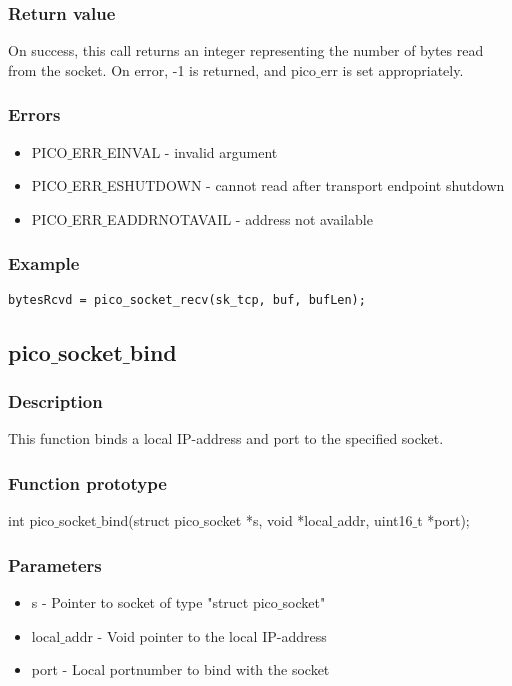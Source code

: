 \subsubsection*{Return value}
On success, this call returns an integer representing the number of bytes read
from the socket. On error, -1 is returned, and pico$\_$err is set appropriately.

\subsubsection*{Errors}
\begin{itemize}
\item PICO$\_$ERR$\_$EINVAL - invalid argument
\item PICO$\_$ERR$\_$ESHUTDOWN - cannot read after transport endpoint shutdown
\item PICO$\_$ERR$\_$EADDRNOTAVAIL - address not available
\end{itemize}

\subsubsection*{Example}
\begin{verbatim}
bytesRcvd = pico_socket_recv(sk_tcp, buf, bufLen);
\end{verbatim}


\subsection{pico$\_$socket$\_$bind}

\subsubsection*{Description}
This function binds a local IP-address and port to the specified socket.

\subsubsection*{Function prototype}
int pico$\_$socket$\_$bind(struct pico$\_$socket *s, void *local$\_$addr, uint16$\_$t *port);

\subsubsection*{Parameters}
\begin{itemize}
\item s - Pointer to socket of type "struct pico$\_$socket"
\item local$\_$addr - Void pointer to the local IP-address
\item port - Local portnumber to bind with the socket
\end{itemize}


